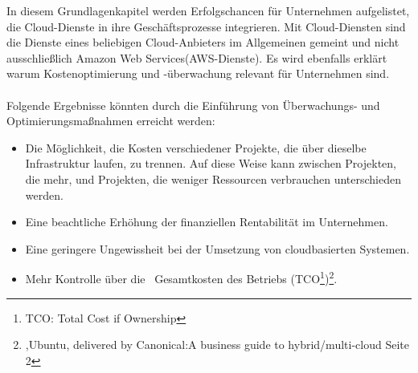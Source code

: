 In diesem Grundlagenkapitel werden Erfolgschancen für Unternehmen aufgelistet, die Cloud-Dienste in ihre Geschäftsprozesse integrieren. Mit Cloud-Diensten sind die Dienste eines beliebigen Cloud-Anbieters im Allgemeinen gemeint und nicht ausschließlich Amazon Web Services(AWS-Dienste). 
Es wird ebenfalls erklärt warum Kostenoptimierung und -überwachung relevant für Unternehmen sind.
\\\\
Folgende Ergebnisse könnten durch die Einführung von Überwachungs- und Optimierungsmaßnahmen erreicht werden:
\begin{itemize}
      \item
            Die Möglichkeit, die Kosten verschiedener Projekte, die über dieselbe Infrastruktur laufen, zu trennen.
            Auf diese Weise kann zwischen Projekten, die mehr, und Projekten, die weniger Ressourcen verbrauchen unterschieden werden.%
      \item
            Eine beachtliche Erhöhung der finanziellen Rentabilität im Unternehmen.%
      \item
            Eine geringere Ungewissheit bei der Umsetzung von cloudbasierten Systemen.
      \item
            Mehr Kontrolle über die  Gesamtkosten des Betriebs (TCO\footnote{TCO: Total Cost if Ownership})\footnote{\cite{CAN01},Ubuntu, delivered by Canonical:A business guide to hybrid/multi-cloud Seite 2}.

\end{itemize}



